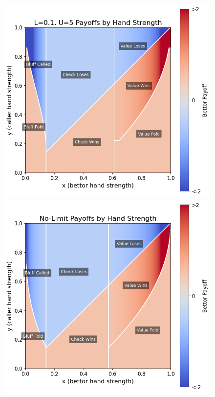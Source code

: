 \documentclass[../../main/main.tex]{subfiles}
\begin{document}
\begin{figure}[p]
\begin{adjustwidth}{-1.25in}{-1.25in}
\begin{minipage}{0.4\textwidth}
        \end{minipage}
        \vspace{0.4cm}\\
        \begin{minipage}{0.4\textwidth}
            \centering
            \includegraphics[width=\textwidth]{../payoff_analysis/images/payoffs_0.1_5.png}
        \end{minipage}
        \hspace{0.05\textwidth}
        \begin{minipage}{0.4\textwidth}
            \centering
            \includegraphics[width=\textwidth]{../payoff_analysis/images/payoffs_0_inf.png}

\end{minipage}
\end{adjustwidth}
\end{figure}
\end{document}
